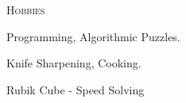 \documentclass[10pt]{article}
\begin{document}
\vspace{0.16in}

\noindent
\textcolor{Primary}{{\large \textsc{Hobbies}}}
\begin{list}{}{\leftmargin=0em}
  \setlength{\itemsep}{1pt}
  \setlength{\parskip}{0pt}
  \setlength{\parsep}{0pt}
  \item{Programming, Algorithmic Puzzles.}
  \item{Knife Sharpening, Cooking.}
  \item{Rubik Cube - Speed Solving}
\end{list}
\end{document}
